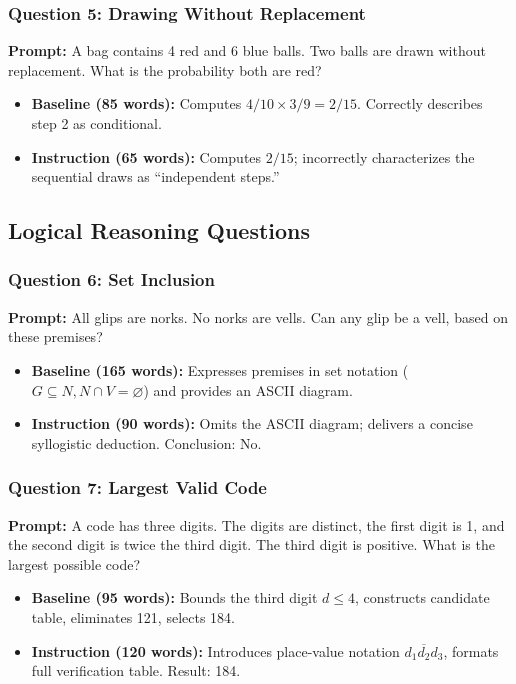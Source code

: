 \documentclass[11pt,a4paper]{article}
\begin{document}
\subsubsection{Question 5: Drawing Without Replacement}
\textbf{Prompt:} A bag contains 4 red and 6 blue balls. Two balls are drawn without replacement. What is the probability both are red?
\begin{itemize}[leftmargin=*]
    \item \textbf{Baseline (85 words):} Computes $4/10 \times 3/9 = 2/15$. Correctly describes step 2 as conditional.
    \item \textbf{Instruction (65 words):} Computes $2/15$; incorrectly characterizes the sequential draws as ``independent steps.''
\end{itemize}

\subsection{Logical Reasoning Questions}

\subsubsection{Question 6: Set Inclusion}
\textbf{Prompt:} All glips are norks. No norks are vells. Can any glip be a vell, based on these premises?
\begin{itemize}[leftmargin=*]
    \item \textbf{Baseline (165 words):} Expresses premises in set notation ($G \subseteq N, N \cap V = \varnothing$) and provides an ASCII diagram.
    \item \textbf{Instruction (90 words):} Omits the ASCII diagram; delivers a concise syllogistic deduction. Conclusion: No.
\end{itemize}

\subsubsection{Question 7: Largest Valid Code}
\textbf{Prompt:} A code has three digits. The digits are distinct, the first digit is 1, and the second digit is twice the third digit. The third digit is positive. What is the largest possible code?
\begin{itemize}[leftmargin=*]
    \item \textbf{Baseline (95 words):} Bounds the third digit $d \le 4$, constructs candidate table, eliminates 121, selects 184.
    \item \textbf{Instruction (120 words):} Introduces place-value notation $\overline{d_1d_2d_3}$, formats full verification table. Result: 184.
\end{itemize}
\end{document}
